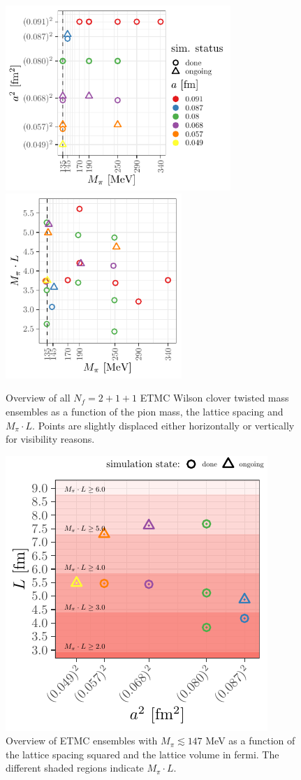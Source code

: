 \documentclass[a4paper,11pt]{article}
\begin{document}
\begin{figure}
  \includegraphics[height=7cm]{plots/ensembles_asquared_mpi}\hfill
  \includegraphics[height=7cm]{plots/ensembles_L_vs_mpi}
  \caption{Overview of all $N_f=2+1+1$ ETMC Wilson clover twisted mass ensembles as a function of the pion mass, the lattice spacing and $M_\pi \cdot L$. Points are slightly displaced either horizontally or vertically for visibility reasons.}
  \label{fig:ensemble_overview}
\end{figure}

\begin{figure}
  \includegraphics[width=0.5\linewidth]{plots/ensembles_phys_point}
  \caption{Overview of ETMC ensembles with $M_\pi \lesssim 147$ MeV as a function of the lattice spacing squared and the lattice volume in fermi. The different shaded regions indicate $M_\pi \cdot L$.}
  \label{fig:ensembles_phys_point}
\end{figure}
\end{document}
